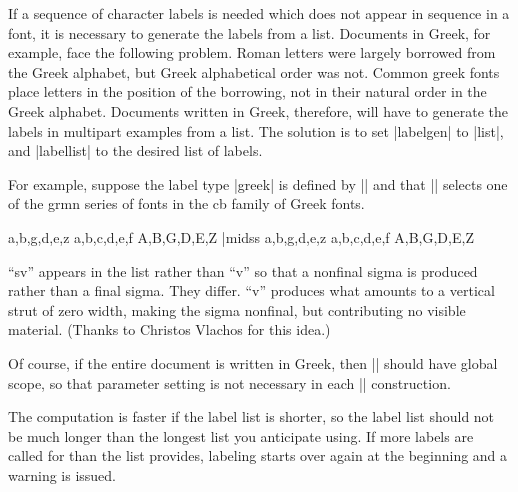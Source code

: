 If a sequence of character labels is needed which does not appear
in sequence in a font, it is necessary to generate the labels
from a list.  Documents in Greek, for example, face the following
problem.  Roman letters were largely borrowed from the Greek
alphabet, but Greek alphabetical order was not.  Common greek
fonts place letters in the position of the borrowing, not in
their natural order in the Greek alphabet.  Documents written in
Greek, therefore, will have to generate the labels in multipart
examples from a list. The solution is to set |labelgen| to
|list|, and |labellist| to the desired list of labels.

For example, suppose the label type |greek| is defined by
\medskip
\noindent ||
\medskip
\noindent and that |\gr| selects one of the grmn series of fonts
in the cb family of Greek fonts.

\begingroup
\let\gr=\twelverm  %
\gr


\beginss
\gr
\pex[labeltype=greek]
\a a,b,g,d,e,z
\a a,b,c,d,e,f
\a A,B,G,D,E,Z
\xe|midss
\pex[labeltype=greek]
\a a,b,g,d,e,z
\a a,b,c,d,e,f
\a A,B,G,D,E,Z
\xe
\endss
\endgroup

\noindent ``sv'' appears in the list rather than ``v'' so that a
nonfinal sigma is produced rather than a final sigma.  They
differ.  ``v'' produces what amounts to a vertical strut of zero
width, making the sigma nonfinal, but contributing no visible
material. (Thanks to Christos Vlachos for this idea.)

Of course, if the entire document is written in Greek, then
\medskip
\noindent ||
\medskip
\noindent should have global scope, so that parameter
setting is not necessary in each |\pex| construction.

The computation is faster if the label list is shorter, so
the label list should not be much longer than the longest list
you anticipate using.  If more labels are called for than the
list provides, labeling starts over again at the beginning and a
warning is issued.



